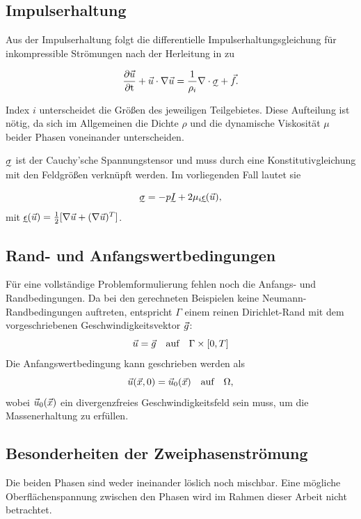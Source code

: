 \subsection{Impulserhaltung}
Aus der Impulserhaltung folgt die differentielle Impulserhaltungsgleichung für inkompressible Strömungen nach der Herleitung in \cite{gravemeier} zu

\begin{equation}
	\partt{\vect{u}} + \vect{u}\cdot\nabla\vect{u}=\frac{1}{\rho_i}\nabla\cdot\tens{\sigma}+\vect{f}.
\end{equation}

Index $i$ unterscheidet die Größen des jeweiligen Teilgebietes. Diese Aufteilung ist nötig, da sich im Allgemeinen die Dichte $\rho$ und die dynamische Viskosität $\mu$ beider Phasen voneinander unterscheiden.

\(\tens{\sigma}\) ist der Cauchy'sche Spannungstensor und muss durch eine Konstitutivgleichung mit den Feldgrößen verknüpft werden. Im vorliegenden Fall lautet sie

\begin{equation}
	\tens{\sigma} = -p\tens{I} + 2\mu_i\tens{\epsilon}(\vect{u}),
\end{equation}
mit \(\tens{\epsilon}(\vect{u})
=\frac{1}{2}[\nabla\vect{u} + (\nabla\vect{u})^T]\).

\subsection{Rand- und Anfangswertbedingungen}
Für eine vollständige Problemformulierung fehlen noch die Anfangs- und Randbedingungen. Da bei den gerechneten Beispielen keine Neumann-Randbedingungen auftreten, entspricht $\Gamma$ einem reinen Dirichlet-Rand mit dem vorgeschriebenen Geschwindigkeitsvektor $\vec{g}$:
\begin{equation}
 \vec{u} = \vec{g} \quad\text{auf}\quad \Gamma \times [0,T]
\end{equation}
Die Anfangswertbedingung kann geschrieben werden als
\begin{equation}
 \vec{u}(\vec{x},0) = \vec{u}_0(\vec{x}) \quad\text{auf}\quad \Omega,
\end{equation}
wobei $\vec{u}_0(\vec{x})$ ein divergenzfreies Geschwindigkeitsfeld sein muss, um die Massenerhaltung zu erfüllen.


\subsection{Besonderheiten der Zweiphasenströmung}
\label{sec:twophaseflow}
Die beiden Phasen sind weder ineinander löslich noch mischbar. Eine mögliche Oberflächenspannung zwischen den Phasen wird im Rahmen dieser Arbeit nicht betrachtet.\\

